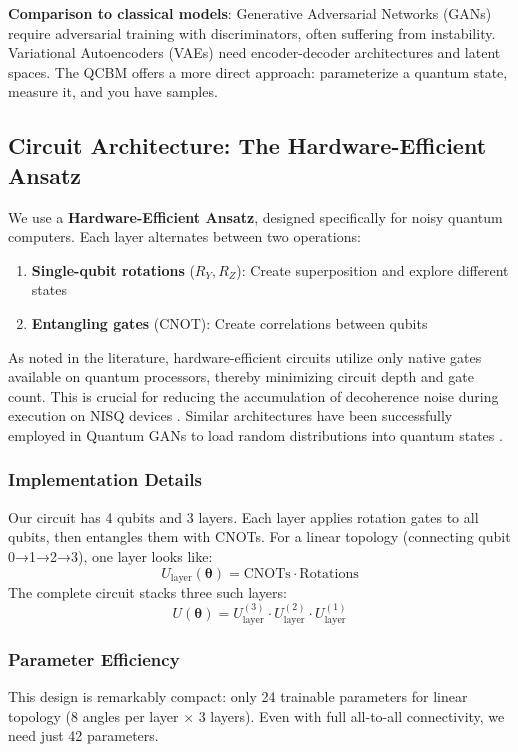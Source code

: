 \documentclass[11pt,a4paper]{article}
\begin{document}
\textbf{Comparison to classical models}: Generative Adversarial Networks (GANs) require adversarial training with discriminators, often suffering from instability. Variational Autoencoders (VAEs) need encoder-decoder architectures and latent spaces. The QCBM offers a more direct approach: parameterize a quantum state, measure it, and you have samples.

\subsection{Circuit Architecture: The Hardware-Efficient Ansatz}
We use a \textbf{Hardware-Efficient Ansatz}, designed specifically for noisy quantum computers. Each layer alternates between two operations:
\begin{enumerate}
    \item \textbf{Single-qubit rotations} ($R_Y, R_Z$): Create superposition and explore different states
    \item \textbf{Entangling gates} (CNOT): Create correlations between qubits
\end{enumerate}

As noted in the literature, hardware-efficient circuits utilize only native gates available on quantum processors, thereby minimizing circuit depth and gate count. This is crucial for reducing the accumulation of decoherence noise during execution on NISQ devices \cite{Benedetti2019}. Similar architectures have been successfully employed in Quantum GANs to load random distributions into quantum states \cite{Zoufal2019}.

\subsubsection{Implementation Details}
Our circuit has 4 qubits and 3 layers. Each layer applies rotation gates to all qubits, then entangles them with CNOTs. For a linear topology (connecting qubit 0→1→2→3), one layer looks like:
\[
U_{\text{layer}}(\boldsymbol{\theta}) = \text{CNOTs} \cdot \text{Rotations}
\]
The complete circuit stacks three such layers:
\[
U(\boldsymbol{\theta}) = U_{\text{layer}}^{(3)} \cdot U_{\text{layer}}^{(2)} \cdot U_{\text{layer}}^{(1)}
\]

\subsubsection{Parameter Efficiency}
This design is remarkably compact: only 24 trainable parameters for linear topology (8 angles per layer × 3 layers). Even with full all-to-all connectivity, we need just 42 parameters.
\end{document}
